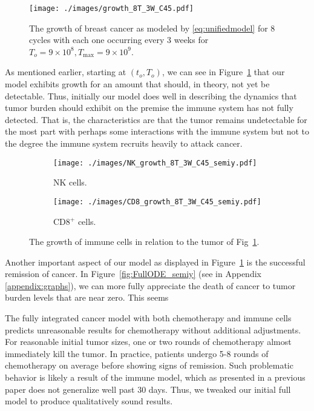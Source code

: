 \documentclass[11pt]{amsart}
\begin{document}
\begin{figure}[h!]
\begin{center} %
\texttt{[image: ./images/growth\_8T\_3W\_C45.pdf]} %
\end{center}
\caption{The growth of breast cancer  as modeled by \eqref{eq:unifiedmodel} for 8 cycles with each one occurring every 3 weeks for $T_o=9\times 10^8, T_{\max}=9\times10^9$.}
\label{fig:FullODE} %
\end{figure}

As mentioned earlier, starting at $(t_o, T_o)$, we can see in Figure~\ref{fig:FullODE} that our model exhibits growth for an amount that should, in theory, not yet be detectable.
Thus, initially our model does well in describing the dynamics that tumor burden should exhibit on the premise the immune system has not fully detected.
That is, the characteristics are that the tumor remains undetectable for the most part with perhaps some interactions with the immune system but not to the degree the immune system recruits heavily to attack cancer.

\begin{figure}[h!]
\centering
	\begin{subfigure}{.5\textwidth}
  		\centering
 		 \texttt{[image: ./images/NK\_growth\_8T\_3W\_C45\_semiy.pdf]}
 		 \caption{NK cells.}
 		 \label{fig:NKGrowth}
	\end{subfigure}%
	\begin{subfigure}{.5\textwidth}
  		\centering
  		\texttt{[image: ./images/CD8\_growth\_8T\_3W\_C45\_semiy.pdf]}
  		\caption{CD8$^+$ cells.}
 		 \label{fig:CD8Growth}
	\end{subfigure}
	\caption{The growth of immune cells in relation to the tumor of Fig~\ref{fig:FullODE}.}
\end{figure}

Another important aspect of our model as displayed in Figure~\ref{fig:FullODE} is the successful remission of cancer.
In Figure~\ref{fig:FullODE_semiy} (see in Appendix \ref{appendix:graphs}), we can more fully appreciate the death of cancer to tumor burden levels that are near zero.
This seems 

The fully integrated cancer model with both chemotherapy and immune cells predicts unreasonable results for chemotherapy without additional adjustments. For reasonable initial tumor sizes, one or two rounds of chemotherapy almost immediately kill the tumor. In practice, patients undergo 5-8 rounds of chemotherapy on average before showing signs of remission. Such problematic behavior is likely a result of the immune model, which as presented in a previous paper does not generalize well past 30 days. Thus, we tweaked our initial full model to produce qualitatively sound results.
 
\end{document}

